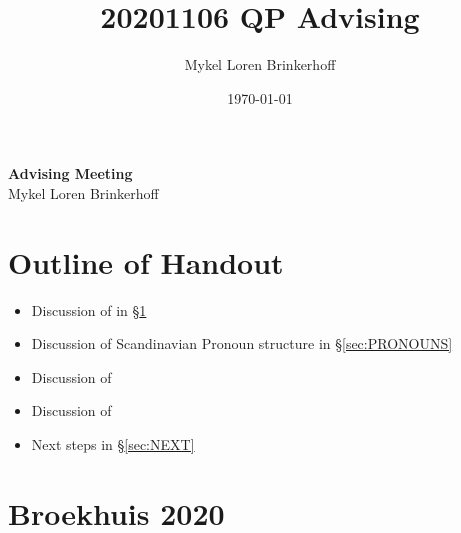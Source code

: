 \documentclass[12pt, letterpaper]{article}
\title{20201106 QP Advising}
\author{Mykel Loren Brinkerhoff}
\date{\today}
\begin{document}
	
	
	
\begin{center}
	{\Large \textbf{Advising Meeting}}\\
	\vspace{6pt}
	Mykel Loren Brinkerhoff
\end{center}
\thispagestyle{fancy}

\section*{Outline of Handout} \label{sec:OUTLINE}
\begin{itemize}
	\item Discussion of \cite{broekhuisUnificationObjectShift2020} in §\ref{sec:BROEKHUIS}
	\item Discussion of Scandinavian Pronoun structure in §\ref{sec:PRONOUNS}
	\item Discussion of \cite{valentinebordalNegationExistentialPredications2017}
	\item Discussion of \cite{zeijlstraSyntacticallyComplexStatus2011}
	\item Next steps in §\ref{sec:NEXT}
\end{itemize}

\section{Broekhuis 2020} \label{sec:BROEKHUIS}
\end{document}
